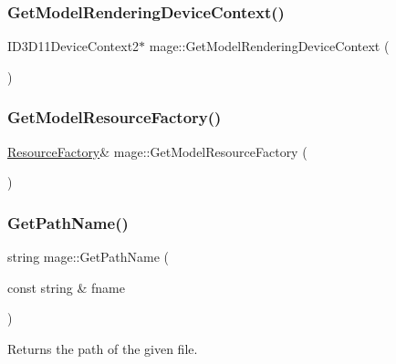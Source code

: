 \hypertarget{namespacemage_a1d373a08e09ec19944bf23feb4688b7e}{}\label{namespacemage_a1d373a08e09ec19944bf23feb4688b7e} 
\subsubsection{\texorpdfstring{Get\+Model\+Rendering\+Device\+Context()}{GetModelRenderingDeviceContext()}}
{\footnotesize\ttfamily I\+D3\+D11\+Device\+Context2$\ast$ mage\+::\+Get\+Model\+Rendering\+Device\+Context (\begin{DoxyParamCaption}{ }\end{DoxyParamCaption})}

\hypertarget{namespacemage_af3f71027fd2cac8d444bae0335fb8fb2}{}\label{namespacemage_af3f71027fd2cac8d444bae0335fb8fb2} 
\subsubsection{\texorpdfstring{Get\+Model\+Resource\+Factory()}{GetModelResourceFactory()}}
{\footnotesize\ttfamily \hyperlink{classmage_1_1_resource_factory}{Resource\+Factory}\& mage\+::\+Get\+Model\+Resource\+Factory (\begin{DoxyParamCaption}{ }\end{DoxyParamCaption})}

\hypertarget{namespacemage_ac5c99281501e7af99e9fd0c332f0e113}{}\label{namespacemage_ac5c99281501e7af99e9fd0c332f0e113} 
\subsubsection{\texorpdfstring{Get\+Path\+Name()}{GetPathName()}\hspace{0.1cm}{\footnotesize\ttfamily [1/2]}}
{\footnotesize\ttfamily string mage\+::\+Get\+Path\+Name (\begin{DoxyParamCaption}\item[{const string \&}]{fname }\end{DoxyParamCaption})}

Returns the path of the given file.


